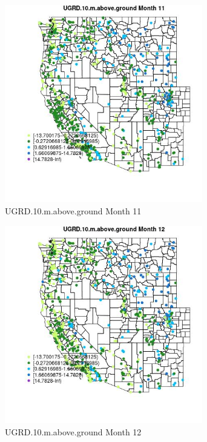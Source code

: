 \begin{figure} 
\centering  
\includegraphics[width=0.77\textwidth]{Code_Outputs/Report_ML_input_PM25_Step4_part_e_de_duplicated_aves_compiled_2019-05-21wNAs_MapObsMo11UGRD10maboveground.jpg} 
\caption{\label{fig:Report_ML_input_PM25_Step4_part_e_de_duplicated_aves_compiled_2019-05-21wNAsMapObsMo11UGRD10maboveground}UGRD.10.m.above.ground Month 11} 
\end{figure} 
 

\begin{figure} 
\centering  
\includegraphics[width=0.77\textwidth]{Code_Outputs/Report_ML_input_PM25_Step4_part_e_de_duplicated_aves_compiled_2019-05-21wNAs_MapObsMo12UGRD10maboveground.jpg} 
\caption{\label{fig:Report_ML_input_PM25_Step4_part_e_de_duplicated_aves_compiled_2019-05-21wNAsMapObsMo12UGRD10maboveground}UGRD.10.m.above.ground Month 12} 
\end{figure} 
 

